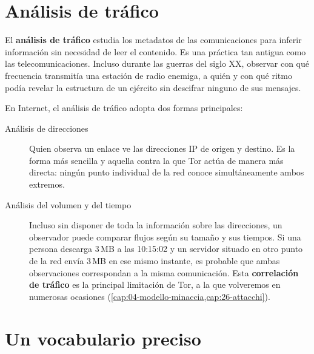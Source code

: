\section{Análisis de tráfico}\label{sec:anon-traffico}

El \textbf{análisis de tráfico} estudia los metadatos de las comunicaciones para inferir información sin necesidad de leer el contenido. Es una práctica tan antigua como las telecomunicaciones. Incluso durante las guerras del siglo XX, observar con qué frecuencia transmitía una estación de radio enemiga, a quién y con qué ritmo podía revelar la estructura de un ejército sin descifrar ninguno de sus mensajes.

En Internet, el análisis de tráfico adopta dos formas principales:
\begin{description}
  \item[Análisis de direcciones] Quien observa un enlace ve las direcciones IP de origen y destino. Es la forma más sencilla y aquella contra la que Tor actúa de manera más directa: ningún punto individual de la red conoce simultáneamente ambos extremos.
  \item[Análisis del volumen y del tiempo] Incluso sin disponer de toda la información sobre las direcciones, un observador puede comparar flujos según su tamaño y sus tiempos. Si una persona descarga 3\,MB a las 10:15:02 y un servidor situado en otro punto de la red envía 3\,MB en ese mismo instante, es probable que ambas observaciones correspondan a la misma comunicación. Esta \textbf{correlación de tráfico} es la principal limitación de Tor, a la que volveremos en numerosas ocasiones (\cref{cap:04-modello-minaccia,cap:26-attacchi}).
\end{description}

\section{Un vocabulario preciso}\label{sec:anon-termini}

